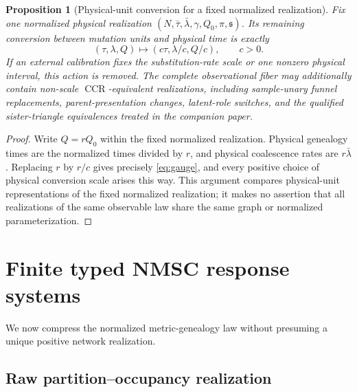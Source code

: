 \documentclass[11pt]{article}
\newtheorem{proposition}[theorem]{Proposition}
\newcommand{\CCR}{\operatorname{CCR}}
\begin{document}
\begin{proposition}[Physical-unit conversion for a fixed normalized realization]
\label{prop:gauge}
Fix one normalized physical realization $(N,\bar\tau,\bar\lambda,\gamma,Q_0,\pi,\mathfrak s)$.  Its remaining conversion between mutation units and physical time is exactly
\[
(\tau,\lambda,Q)\longmapsto(c\tau,\lambda/c,Q/c),\qquad c>0.
\]
If an external calibration fixes the substitution-rate scale or one nonzero physical interval, this action is removed.  The complete observational fiber may additionally contain non-scale $\CCR$-equivalent realizations, including sample-unary funnel replacements, parent-presentation changes, latent-role switches, and the qualified sister-triangle equivalences treated in the companion paper.
\end{proposition}

\begin{proof}
Write $Q=rQ_0$ within the fixed normalized realization.  Physical genealogy times are the normalized times divided by $r$, and physical coalescence rates are $r\bar\lambda$.  Replacing $r$ by $r/c$ gives precisely \eqref{eq:gauge}, and every positive choice of physical conversion scale arises this way.  This argument compares physical-unit representations of the fixed normalized realization; it makes no assertion that all realizations of the same observable law share the same graph or normalized parameterization.
\end{proof}

\section{Finite typed NMSC response systems}
\label{sec:ccr}

We now compress the normalized metric-genealogy law without presuming a unique positive network realization.

\subsection{Raw partition--occupancy realization}
\end{document}

